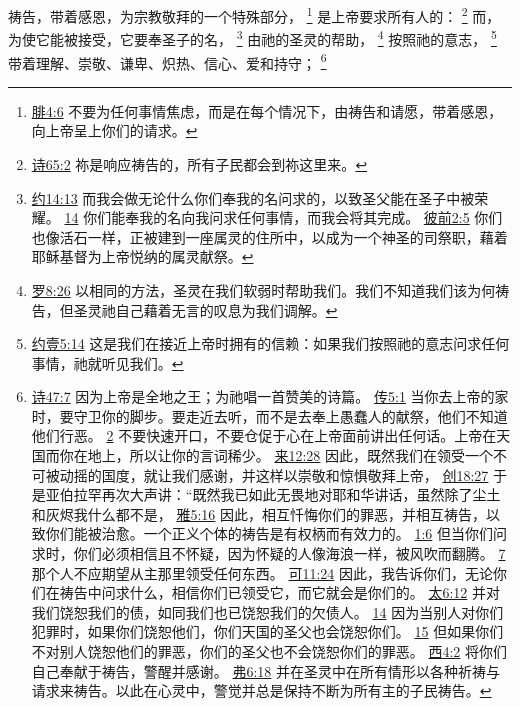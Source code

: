 \documentclass[12pt, a4paper, oneside]{ctexart}
\newcounter{parnum}[section]
\newcommand{\N}{%
   \noindent\refstepcounter{parnum}%
    \makebox[\parindent][l]{\textbf{\arabic{parnum}.}}}
\begin{document}
\N 祷告，带着感恩，为宗教敬拜的一个特殊部分，
	\footnote {
		\href{https://biblehub.com/philippians/4-6.htm}{腓4:6} 不要为任何事情焦虑，而是在每个情况下，由祷告和请愿，带着感恩，向上帝呈上你们的请求。
	}
	是上帝要求所有人的：
	\footnote {
		\href{https://biblehub.com/psalms/65-2.htm}{诗65:2} 祢是响应祷告的，所有子民都会到祢这里来。
	}
	而，为使它能被接受，它要奉圣子的名，
	\footnote {
		\href{https://biblehub.com/john/14-13.htm}{约14:13} 而我会做无论什么你们奉我的名问求的，以致圣父能在圣子中被荣耀。
		\href{https://biblehub.com/john/14-14.htm}{14} 你们能奉我的名向我问求任何事情，而我会将其完成。
		\href{https://biblehub.com/1_peter/2-5.htm}{彼前2:5} 你们也像活石一样，正被建到一座属灵的住所中，以成为一个神圣的司祭职，藉着耶稣基督为上帝悦纳的属灵献祭。
	}
	由祂的圣灵的帮助，
	\footnote {
		\href{https://biblehub.com/romans/8-26.htm}{罗8:26} 以相同的方法，圣灵在我们软弱时帮助我们。我们不知道我们该为何祷告，但圣灵祂自己藉着无言的叹息为我们调解。
	}
	按照祂的意志，
	\footnote {
		\href{https://biblehub.com/1_john/5-14.htm}{约壹5:14} 这是我们在接近上帝时拥有的信赖：如果我们按照祂的意志问求任何事情，祂就听见我们。
	}
	带着理解、崇敬、谦卑、炽热、信心、爱和持守；
	\footnote {
		\href{https://biblehub.com/psalms/47-7.htm}{诗47:7} 因为上帝是全地之王；为祂唱一首赞美的诗篇。
		\href{https://biblehub.com/ecclesiastes/5-1.htm}{传5:1} 当你去上帝的家时，要守卫你的脚步。要走近去听，而不是去奉上愚蠢人的献祭，他们不知道他们行恶。
		\href{https://biblehub.com/ecclesiastes/5-2.htm}{2} 不要快速开口，不要仓促于心在上帝面前讲出任何话。上帝在天国而你在地上，所以让你的言词稀少。
		\href{https://biblehub.com/hebrews/12-28.htm}{来12:28} 因此，既然我们在领受一个不可被动摇的国度，就让我们感谢，并这样以崇敬和惊惧敬拜上帝，
		\href{https://biblehub.com/genesis/18-27.htm}{创18:27} 于是亚伯拉罕再次大声讲：“既然我已如此无畏地对耶和华讲话，虽然除了尘土和灰烬我什么都不是，
		\href{https://biblehub.com/james/5-16.htm}{雅5:16} 因此，相互忏悔你们的罪恶，并相互祷告，以致你们能被治愈。一个正义个体的祷告是有权柄而有效力的。
		\href{https://biblehub.com/james/1-6.htm}{1:6} 但当你们问求时，你们必须相信且不怀疑，因为怀疑的人像海浪一样，被风吹而翻腾。
		\href{https://biblehub.com/james/1-7.htm}{7} 那个人不应期望从主那里领受任何东西。
		\href{https://biblehub.com/mark/11-24.htm}{可11:24} 因此，我告诉你们，无论你们在祷告中问求什么，相信你们已领受它，而它就会是你们的。
		\href{https://biblehub.com/matthew/6-12.htm}{太6:12} 并对我们饶恕我们的债，如同我们也已饶恕我们的欠债人。
		\href{https://biblehub.com/matthew/6-14.htm}{14} 因为当别人对你们犯罪时，如果你们饶恕他们，你们天国的圣父也会饶恕你们。
		\href{https://biblehub.com/matthew/6-15.htm}{15} 但如果你们不对别人饶恕他们的罪恶，你们的圣父也不会饶恕你们的罪恶。
		\href{https://biblehub.com/colossians/4-2.htm}{西4:2} 将你们自己奉献于祷告，警醒并感谢。
		\href{https://biblehub.com/ephesians/6-18.htm}{弗6:18} 并在圣灵中在所有情形以各种祈祷与请求来祷告。以此在心灵中，警觉并总是保持不断为所有主的子民祷告。
	}
\end{document}
